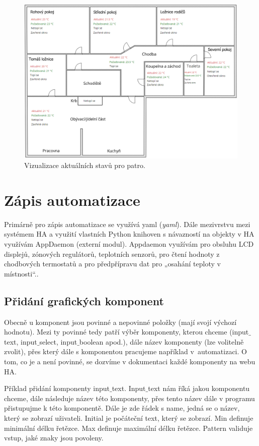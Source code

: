\begin{figure}[H]
    \centering
    \includegraphics[width=\textwidth]{images/software-ha/vizualizace-hodnot-patro-pudorys.png}
    \caption{Vizualizace aktuálních stavů pro patro.}
    \label{fig:vizualizace-hodnot-patro-pudorys}
\end{figure}


\section{Zápis automatizace}
Primárně pro zápis automatizace se využívá \acrshort{yaml} (\textit{\acrlong{yaml}}). Dále mezivrstvu mezi systémem HA a využití vlastních Python knihoven s návazností na objekty v HA využívám AppDaemon (externí modul). Appdaemon využívám pro obsluhu LCD displejů, zónových regulátorů, teplotních senzorů, pro čtení hodnoty z chodbových termostatů a pro předpřípravu dat pro „osahání teploty v místnosti“.. 

\subsection{Přidání grafických komponent}
Obecně u komponent jsou povinné a nepovinné položky (mají svojí výchozí hodnotu). Mezi ty povinné tedy patří výběr komponenty, kterou chceme (input$\_$text, input$\_$select, input$\_$boolean apod.), dále název komponenty (lze volitelně zvolit), přes který dále s komponentou pracujeme například v~automatizaci. O tom, co je a není povinné, se dozvíme v dokumentaci každé komponenty na webu HA.

Příklad přidání komponenty input$\_$text. Input$\_$text nám říká jakou komponentu chceme, dále následuje název této komponenty, přes tento název dále v programu přistupujme k této komponentě. Dále je zde řádek s name,
jedná se o název, který se zobrazí uživateli. Initial je počáteční text, který se zobrazí. Min definuje minimální délku řetězce. Max definuje maximální délku řetězce. Pattern validuje vstup, jaké znaky jsou povoleny.

